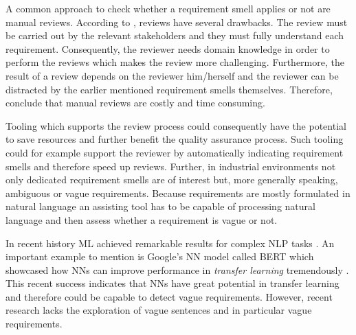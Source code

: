 A common approach to check whether a requirement smell applies or not are manual reviews.
According to \textcite{Salger:2013}, reviews have several drawbacks.
The review must be carried out by the relevant stakeholders and they must fully understand each requirement.
Consequently, the reviewer needs domain knowledge in order to perform the reviews which makes the review more challenging.
Furthermore, the result of a review depends on the reviewer him/herself \parencite{Zelkowitz:1983} and the reviewer can be distracted by the earlier mentioned requirement smells themselves.
Therefore, \textcite{Femmer:2017} conclude that manual reviews are costly and time consuming.

Tooling which supports the review process could consequently have the potential to save resources and further benefit the quality assurance process.
Such tooling could for example support the reviewer by automatically indicating requirement smells and therefore speed up reviews.
Further, in industrial environments not only dedicated requirement smells are of interest but, more generally speaking, ambiguous or vague requirements.
Because requirements are mostly formulated in natural language \parencite{Mich:2004} an assisting tool has to be capable of processing natural language and then assess whether a requirement is vague or not.

In recent history \Ac{ML} achieved remarkable results for complex \ac{NLP} tasks \parencite{Khan:2016}.
An important example to mention is Google's \ac{NN} model called BERT which showcased how \acp{NN} can improve performance in \textit{transfer learning} tremendously \parencite{Devlin:2018}.
This recent success indicates that \acp{NN} have great potential in transfer learning and therefore could be capable to detect vague requirements.
However, recent research lacks the exploration of vague sentences and in particular vague requirements.

